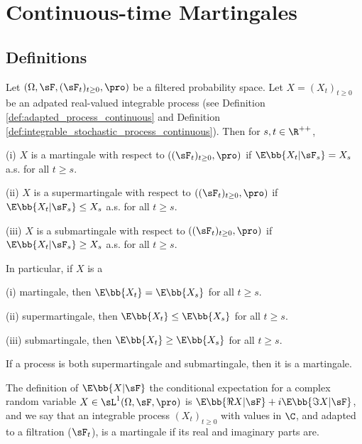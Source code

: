 
\section{Continuous-time Martingales}

\subsection{Definitions}

\begin{definition}\label{def:martingale_super_sub_continuous}
Let $(\Omega,\sF, (\sF_t)_{t\geq 0},\pro)$ be a filtered probability space. Let $X = (X_t)_{t\geq 0}$ be an adpated real-valued integrable process (see Definition \ref{def:adapted_process_continuous} and Definition \ref{def:integrable_stochastic_process_continuous}). Then for $s,t\in \R^{++}$,
\ben
\item [(i)] $X$ is a martingale with respect to $((\sF_t)_{t\geq 0},\pro)$ if $\E\bb{X_t | \sF_s} = X_s$ a.s. for all $t \geq s$.
\item [(ii)] $X$ is a supermartingale with respect to $((\sF_t)_{t\geq 0},\pro)$ if $\E\bb{X_t | \sF_s}\leq X_s$ a.s. for all $t\geq s$.
\item [(iii)] $X$ is a submartingale with respect to $((\sF_t)_{t\geq 0},\pro)$ if $\E\bb{X_t | \sF_s} \geq X_s$ a.s. for all $t\geq s$.
\een

In particular, if $X$ is a
\ben
\item [(i)] martingale, then $\E\bb{X_t} = \E\bb{X_s}$ for all $t\geq s$.
\item [(ii)] supermartingale, then $\E\bb{X_t} \leq \E\bb{X_s}$ for all $t\geq s$.
\item [(iii)] submartingale, then $\E\bb{X_t} \geq \E\bb{X_s}$ for all $t\geq s$.
\een
\end{definition}

\begin{remark}
If a process is both supermartingale and submartingale, then it is a martingale.
\end{remark}

\begin{remark}
The definition of $\E\bb{X|\sF}$ the conditional expectation for a complex random variable $X \in \sL^1(\Omega,\sF,\pro)$ is $\E\bb{\Re X|\sF} + i\E\bb{\Im X|\sF}$, and we say that an integrable process $(X_t)_{t \geq 0}$
with values in $\C$, and adapted to a filtration ($\sF_t$), is a martingale if its real and imaginary parts are.
\end{remark}

